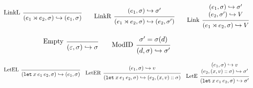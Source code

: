 \documentclass[acmsmall,screen,review]{acmart}\settopmatter{printfolios=true,printccs=false,printacmref=false}
\theoremstyle{acmdefinition}
\newcommand*{\cons}{::}
\newcommand*{\modid}{d}
\newcommand*{\ctx}{\sigma}
\newcommand*{\semarrow}{\hookrightarrow}
\newcommand*{\link}[2]{{#1}\rtimes{#2}}
\begin{document}
\begin{figure}[t!]
  \[
    \begin{prooftree}
      \infer[left label=LinkL]0{
      (\link{e_{1}}{e_{2}}, \ctx)
      \semarrow
      (e_{1}, \ctx)
      }
    \end{prooftree}\qquad
    \begin{prooftree}
      \hypo{
        \begin{matrix}
          (e_{1}, \ctx)
          \semarrow
          \ctx'
        \end{matrix}
      }
      \infer[left label=LinkR]1{
      (\link{e_{1}}{e_{2}}, \ctx)
      \semarrow
      (e_{2}, \ctx')
      }
    \end{prooftree}\qquad
    \begin{prooftree}
      \hypo{
        \begin{matrix}
          (e_{1}, \ctx)
          \semarrow
          \ctx' \\
          (e_{2}, \ctx')
          \semarrow
          V
        \end{matrix}
      }
      \infer[left label=Link]1{
      (\link{e_{1}}{e_{2}}, \ctx)
      \semarrow
      V
      }
    \end{prooftree}
  \]

  \[
    \begin{prooftree}
      \infer[left label=Empty]0{
      (\varepsilon, \ctx)
      \semarrow
      \ctx
      }
    \end{prooftree}\qquad
    \begin{prooftree}
      \hypo{\ctx'=\ctx(\modid)}
      \infer[left label=ModID]1{
      (\modid, \ctx)
      \semarrow
      \ctx'
      }
    \end{prooftree}
  \]

  \[
    \begin{prooftree}
      \infer[left label=LetEL]0{
      (\mathtt{let}\:x\:e_1\:e_2, \ctx)
      \semarrow
      (e_{1}, \ctx)
      }
    \end{prooftree}\quad
    \begin{prooftree}
      \hypo{
        \begin{matrix}
          (e_{1}, \ctx)
          \semarrow
          v
        \end{matrix}
      }
      \infer[left label=LetER]1{
      (\mathtt{let}\:x\:e_1\:e_2, \ctx)
      \semarrow
      (e_{2}, (x, v)\cons \ctx)
      }
    \end{prooftree}\quad
    \begin{prooftree}
      \hypo{
        \begin{matrix}
          (e_{1}, \ctx)
          \semarrow
          v \\
          (e_{2}, (x, v)\cons \ctx)
          \semarrow
          \ctx'
        \end{matrix}
      }
      \infer[left label=LetE]1{
      (\mathtt{let}\:x\:e_1\:e_2, \ctx)
      \semarrow
      \ctx'
      }
    \end{prooftree}
  \]


\end{figure}
\end{document}
